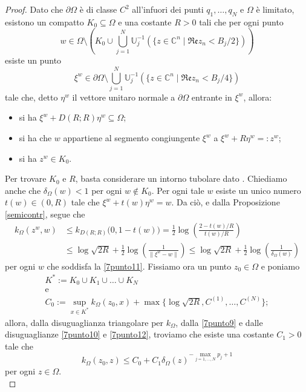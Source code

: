 \begin{proof}
    Dato che $\partial\Omega$ è di classe $C^2$ all'infuori dei punti $q_1,\dots,q_N$ e $\Omega$ è limitato, esistono un compatto $K_0\subseteq\Omega$ e una costante $R>0$ tali che per ogni punto
    \begin{equation}\label{7punto11}
        w\in\Omega\setminus\left(K_0\cup\bigcup_{j=1}^N\mathbb{U}_j^{-1}(\{z\in\mathbb{C}^n\mid\mathfrak{Re}z_n<B_j/2\})\right)
    \end{equation}
    esiste un punto
    $$\xi^w\in\partial\Omega\setminus\bigcup_{j=1}^N\mathbb{U}_j^{-1}(\{z\in\mathbb{C}^n\mid\mathfrak{Re}z_n<B_j/4\})$$
    tale che, detto $\eta^w$ il vettore unitaro normale a $\partial\Omega$ entrante in $\xi^w$, allora:
    \begin{itemize}
        \item si ha $\xi^w+D(R;R)\eta^w\subseteq \Omega$;
        \item si ha che $w$ appartiene al segmento congiungente $\xi^w$ a $\xi^w+R\eta^w=:z^w$;
        \item si ha $z^w\in K_0$.
    \end{itemize}
    Per trovare $K_0$ e $R$, basta considerare un intorno tubolare dato \cite[Chapter 9, Theorem 20]{Sp}. Chiediamo anche che $\delta_\Omega(w)<1$ per ogni $w\not\in K_0$. Per ogni tale $w$ esiste un unico numero $t(w)\in(0,R)$ tale che $\xi^w+t(w)\eta^w=w$. Da ciò, e dalla Proposizione \ref{semicontr}, segue che
    \begin{equation}\label{7punto12}
        \begin{aligned}
            k_\Omega(z^w,w)&\le k_{D(R;R)}\big(0,1-t(w)\big)=\frac{1}{2}\log\left(\frac{2-t(w)/R}{t(w)/R}\right)\\
            &\le\log{\sqrt{2R}}+\frac{1}{2}\log\left(\frac{1}{\|\xi^w-w\|}\right)\le\log{\sqrt{2R}}+\frac{1}{2}\log\left(\frac{1}{\delta_\Omega(w)}\right)
        \end{aligned}
    \end{equation}
    per ogni $w$ che soddisfa la \eqref{7punto11}. Fissiamo ora un punto $z_0\in\Omega$ e poniamo
    \begin{gather*}
        K^*:=K_0\cup K_1\cup\dots\cup K_N\\
        \text{e}\\
        C_0:=\displaystyle\sup_{x\in K^*}k_\Omega(z_0,x)+\max\{\log{\sqrt{2R}},C^{(1)},\dots,C^{(N)}\};
    \end{gather*}
    allora, dalla disuguaglianza triangolare per $k_\Omega$, dalla \eqref{7punto9} e dalle disuguaglianze \eqref{7punto10} e \eqref{7punto12}, troviamo che esiste una costante $C_1>0$ tale che
    $$k_\Omega(z_0,z)\le C_0+C_1\delta_\Omega(z)^{-\max_{j=1,\dots,N}p_j+1}$$
    per ogni $z\in\Omega$.\\


\end{proof}
